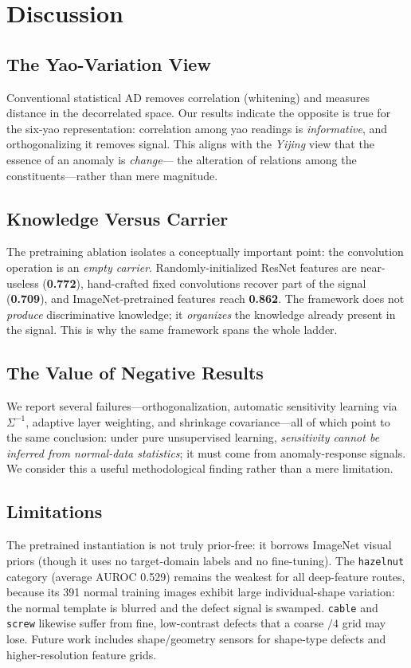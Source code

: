\documentclass[preprint,12pt]{elsarticle}
\begin{document}
\section{Discussion}
\subsection{The Yao-Variation View}
Conventional statistical AD removes correlation (whitening) and measures
distance in the decorrelated space. Our results indicate the opposite is
true for the six-yao representation: correlation among yao readings is
\emph{informative}, and orthogonalizing it removes signal. This aligns with
the \emph{Yijing} view that the essence of an anomaly is \emph{change}---
the alteration of relations among the constituents---rather than mere
magnitude.

\subsection{Knowledge Versus Carrier}
The pretraining ablation isolates a conceptually important point: the
convolution operation is an \emph{empty carrier}. Randomly-initialized
ResNet features are near-useless (\textbf{0.772}), hand-crafted fixed
convolutions recover part of the signal (\textbf{0.709}), and
ImageNet-pretrained features reach \textbf{0.862}. The framework does not
\emph{produce} discriminative knowledge; it \emph{organizes} the knowledge
already present in the signal. This is why the same framework spans the
whole ladder.

\subsection{The Value of Negative Results}
We report several failures---orthogonalization, automatic sensitivity
learning via $\Sigma^{-1}$, adaptive layer weighting, and shrinkage
covariance---all of which point to the same conclusion: under pure
unsupervised learning, \emph{sensitivity cannot be inferred from
normal-data statistics}; it must come from anomaly-response signals. We
consider this a useful methodological finding rather than a mere
limitation.

\subsection{Limitations}
The pretrained instantiation is not truly prior-free: it borrows ImageNet
visual priors (though it uses no target-domain labels and no fine-tuning).
The \texttt{hazelnut} category (average AUROC 0.529) remains the weakest
for all deep-feature routes, because its 391 normal training images exhibit
large individual-shape variation: the normal template is blurred and the
defect signal is swamped. \texttt{cable} and \texttt{screw} likewise
suffer from fine, low-contrast defects that a coarse $/4$ grid may lose.
Future work includes shape/geometry sensors for shape-type defects and
higher-resolution feature grids.
\end{document}
